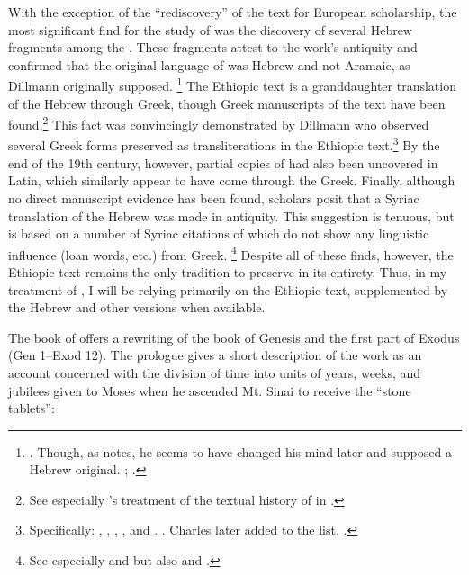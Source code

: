 With the exception of the ``rediscovery'' of the text for European scholarship, the most significant find for the study of \jub was the discovery of several Hebrew fragments among the \dss. These fragments  attest to the work's antiquity and confirmed that the original language of \jub was Hebrew and not Aramaic, as Dillmann originally supposed.%
        \footnote{\cite[90]{dillamnn_jbw1850}. Though, as \vanderkam notes, he seems to have changed his mind later and supposed a Hebrew original. \cite[324]{dillmann_spaw1883}; \cite[1:1 n. 1]{vanderkam2018}.}
The Ethiopic text is a granddaughter translation of the Hebrew through Greek, though Greek manuscripts of the text have been found.\footnote{See especially \vanderkam's treatment of the textual history of \jub in \cite*[1--18]{vanderkam1977}.} This fact was convincingly demonstrated by Dillmann who observed several Greek forms preserved as transliterations in the Ethiopic text.\footnote{Specifically: , , , , and . \cite[88]{dillamnn_jbw1850}. Charles later added  to the list. \cite[xxx]{charles1902}.} By the end of the 19th century, however, partial copies of \jub had also been uncovered in Latin, which similarly appear to have come through the Greek. Finally, although no direct manuscript evidence has been found, \jub scholars posit that a Syriac translation of the Hebrew was made in antiquity. This suggestion is tenuous, but is based on a number of Syriac citations of \jub which do not show any linguistic influence (loan words, etc.) from Greek.%
        \footnote{%
                See especially
                \cite[231--232]{tisserant_rb1921} and 
                \cite[xxix]{charles1902} but also 
                \cite[2:ix--x]{ceriani1861} and 
                \cite[x]{charles1895}.}
Despite all of these finds, however, the Ethiopic text remains the only tradition to preserve \jub in its entirety. Thus, in my treatment of \jub, I will be relying primarily on the Ethiopic text, supplemented by the Hebrew and other versions when available.

The book of \jub offers a rewriting of the book of Genesis and the first part of Exodus (Gen 1--Exod 12).\autocite[1:17]{vanderkam2018}  The prologue gives a short description of the work as an account concerned with the division of time into units of years, weeks, and jubilees given to Moses when he ascended Mt. Sinai to receive the ``stone tablets'':

